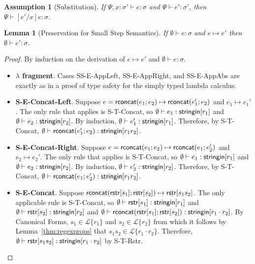 \documentclass[11pt,leqno]{article}
\newtheorem{trlem}[tr]{Lemma}
\newtheorem{ass}[tr]{Assumption}
\theoremstyle{definition}
\newcommand{\Lagr}{\mathcal{L}}
\newcommand{\lang}[1]{\Lagr\{#1\}}
\newcommand{\stringin}[1]{{\sf stringin}[#1]}
\begin{document}
\begin{ass}[Substitution] \label{lem:subst}
If $\Psi, x : \sigma' \vdash e : \sigma$ and $\Psi \vdash e' : \sigma'$, then
$\Psi \vdash [e' / x] e : \sigma$.
\end{ass}

\begin{trlem}[Preservation for Small Step Semantics]
If $\emptyset \vdash e : \sigma$ and $e \mapsto e'$ then $\emptyset \vdash e' : \sigma$.
\end{trlem}
\begin{proof}

By induction on the derivation of $e \mapsto e'$ and $\emptyset \vdash e : \sigma$.

\begin{itemize}[label=$ $,itemsep=1ex]
\item \textbf{$\lambda$ fragment}. Cases SS-E-AppLeft, SS-E-AppRight, and SS-E-AppAbs are exactly as in a proof of type safety for
the simply typed lambda calculus.

\item \textbf{S-E-Concat-Left}.
Suppose $e = {\sf rconcat}(e_1;e_2) \mapsto {\sf rconcat}(e_1';e_2)$ and $e_1 \mapsto e_1'$.
The only rule that applies is S-T-Concat, so $\emptyset\vdash e_1 : \stringin{r_1}$ and $\emptyset\vdash e_2 : \stringin{r_2}$.
By induction, $\emptyset\vdash e_1' : \stringin{r_1}$.
Therefore, by S-T-Concat, $\emptyset\vdash \rconcat{e_1'}{e_2} : \stringin{r_1r_2}$.

\item {\textbf{S-E-Concat-Right}}. 
Suppose $e = {\sf rconcat}(e_1;e_2) \mapsto {\sf rconcat}(e_1;e_2')$ and $e_2 \mapsto e_2'$.
The only rule that applies is S-T-Concat, so $\emptyset\vdash e_1 : \stringin{r_1}$ and $\emptyset\vdash e_2 : \stringin{r_2}$.
By induction, $\emptyset\vdash e_2' : \stringin{r_2}$.
Therefore, by S-T-Concat, $\emptyset\vdash \rconcat{e_1}{e_2'} : \stringin{r_1r_2}$.


\item \textbf{S-E-Concat}. 
Suppose ${\sf rconcat}({\sf rstr}[s_1];{\sf rstr}[s_2]) \mapsto {\sf rstr}[s_1s_2]$.
The only applicable rule is S-T-Concat, so 
$\emptyset\vdash\rstr{s_1} : \stringin{r_1}$ 
and
$\emptyset\vdash\rstr{s_2} : \stringin{r_2}$ and $\emptyset \vdash \rconcat{\rstr{s_1}}{\rstr{s_2}} : \stringin{r_1 \cdot r_2}$. 
By Canonical Forms, $s_1 \in \lang{r_1}$ and $s_2 \in  \lang{r_2}$ from which it follows by Lemma~\ref{thm:regexprops}
that $s_1s_2 \in \lang{r_1\cdot r_2}$. Therefore, $\emptyset\vdash \rstr{s_1s_2} : \stringin{r_1\cdot r_2}$ by S-T-Rstr.


\end{itemize}
\end{proof}
\end{document}
